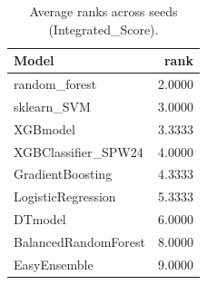 \begin{table}[t]
\centering
\begin{tabular}{lr}
\toprule
Model & rank \\
\midrule
random_forest & 2.0000 \\
sklearn_SVM & 3.0000 \\
XGBmodel & 3.3333 \\
XGBClassifier_SPW24 & 4.0000 \\
GradientBoosting & 4.3333 \\
LogisticRegression & 5.3333 \\
DTmodel & 6.0000 \\
BalancedRandomForest & 8.0000 \\
EasyEnsemble & 9.0000 \\
\bottomrule
\end{tabular}
\caption{Average ranks across seeds (Integrated_Score).}
\label{tab:avg_rank_Integrated_Score}
\end{table}